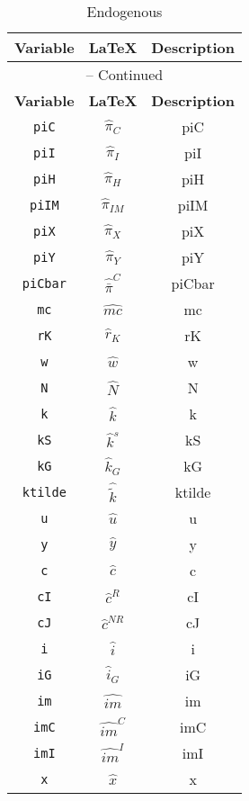 \begin{center}
\begin{longtable}{ccc}
\caption{Endogenous}\\%
\hline%
\multicolumn{1}{c}{\textbf{Variable}} &
\multicolumn{1}{c}{\textbf{\LaTeX}} &
\multicolumn{1}{c}{\textbf{Description}}\\%
\hline\hline%
\endfirsthead
\multicolumn{3}{c}{{\tablename} \thetable{} -- Continued}\\%
\hline%
\multicolumn{1}{c}{\textbf{Variable}} &
\multicolumn{1}{c}{\textbf{\LaTeX}} &
\multicolumn{1}{c}{\textbf{Description}}\\%
\hline\hline%
\endhead
\texttt{piC} & $\hat{\pi}_{C}$ & piC\\
\texttt{piI} & $\hat{\pi}_{I}$ & piI\\
\texttt{piH} & $\hat{\pi}_{H}$ & piH\\
\texttt{piIM} & $\hat{\pi}_{IM}$ & piIM\\
\texttt{piX} & $\hat{\pi}_{X}$ & piX\\
\texttt{piY} & $\hat{\pi}_{Y}$ & piY\\
\texttt{piCbar} & $\hat{\bar{\pi}}^C$ & piCbar\\
\texttt{mc} & $\hat{mc}$ & mc\\
\texttt{rK} & $\hat{r}_K$ & rK\\
\texttt{w} & $\hat{w}$ & w\\
\texttt{N} & $\hat{N}$ & N\\
\texttt{k} & $\hat{k}$ & k\\
\texttt{kS} & $\hat{k}^s$ & kS\\
\texttt{kG} & $\hat{k}_G$ & kG\\
\texttt{ktilde} & $\hat{\tilde{k}}$ & ktilde\\
\texttt{u} & $\hat{u}$ & u\\
\texttt{y} & $\hat{y}$ & y\\
\texttt{c} & $\hat{c}$ & c\\
\texttt{cI} & $\hat{c}^R$ & cI\\
\texttt{cJ} & $\hat{c}^{NR}$ & cJ\\
\texttt{i} & $\hat{i}$ & i\\
\texttt{iG} & $\hat{i}_G$ & iG\\
\texttt{im} & $\hat{im}$ & im\\
\texttt{imC} & $\hat{im}^C$ & imC\\
\texttt{imI} & $\hat{im}^I$ & imI\\
\texttt{x} & $\hat{x}$ & x\\

\end{longtable}
\end{center}
